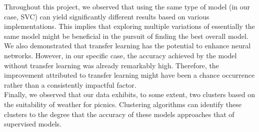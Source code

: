 \documentclass[a4paper]{article}
\begin{document}
	
	Throughout this project, we observed that using the same type of model (in our case, SVC) can yield significantly different results based on various implementations. This implies that exploring multiple variations of essentially the same model might be beneficial in the pursuit of finding the best overall model.
	\\
	
	We also demonstrated that transfer learning has the potential to enhance neural networks. However, in our specific case, the accuracy achieved by the model without transfer learning was already remarkably high. Therefore, the improvement attributed to transfer learning might have been a chance occurrence rather than a consistently impactful factor.   
	\\
	
	Finally, we observed that our data exhibits, to some extent, two clusters based on the suitability of weather for picnics. Clustering algorithms can identify these clusters to the degree that the accuracy of these models approaches that of supervised models. 
	
\end{document}
